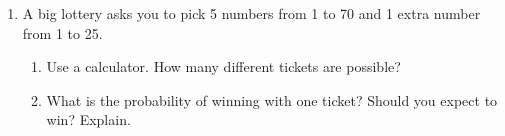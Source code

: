 \documentclass[11pt]{article}
\begin{document}
\begin{enumerate}
\item A big lottery asks you to pick 5 numbers from 1 to 70 and 1 extra number from 1 to 25.
\begin{enumerate}[itemsep=1em]
  \item Use a calculator. How many different tickets are possible?

  \work{2em}
  \item What is the probability of winning with one ticket? Should you expect to win? Explain.

\end{enumerate}

\end{enumerate}
\end{document}
